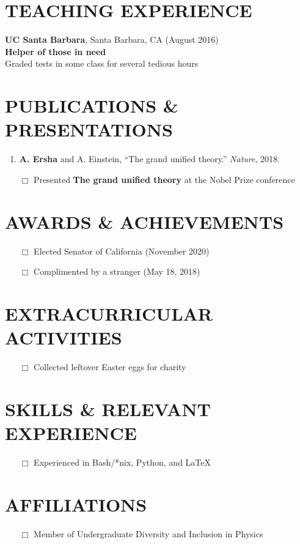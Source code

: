 \documentclass[11pt]{res} %
\begin{document}
\begin{resume}
\section{TEACHING EXPERIENCE}
\textbf{UC Santa Barbara}, Santa Barbara, CA (August 2016) \\
\textbf{Helper of those in need} \\
Graded tests in some class for several tedious hours

\section{PUBLICATIONS \& PRESENTATIONS}

\begin{enumerate}
\item \textbf{A. Ersha} and A. Einstein, ``The grand unified theory.'' \textit{Nature}, 2018.
\end{enumerate}

\begin{itemize} \itemsep -12pt 
 \item[$\Box$] Presented \textbf{The grand unified theory} at
     the Nobel Prize conference \\
\end{itemize}

\section{AWARDS \& ACHIEVEMENTS}
\begin{itemize}
    \item[$\Box$] Elected Senator of California (November 2020)
    \item[$\Box$] Complimented by a stranger (May 18, 2018)
\end{itemize}

\section{EXTRACURRICULAR ACTIVITIES}
\begin{itemize} \itemsep 0pt 
        \item[$\Box$] Collected leftover Easter eggs for charity
\end{itemize}

\section{SKILLS \& RELEVANT EXPERIENCE}
\begin{itemize} \itemsep -4pt 
 \item[$\Box$]  Experienced in Bash/*nix, Python, and LaTeX
\end{itemize}

\section{AFFILIATIONS}
\begin{itemize}
    \item[$\Box$] Member of Undergraduate Diversity and Inclusion in Physics
\end{itemize}

\end{resume}
\end{document}
